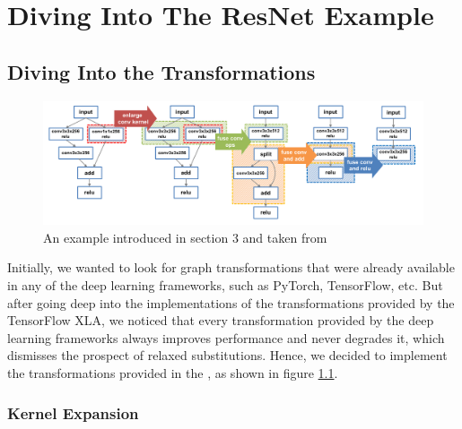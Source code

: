 \documentclass[12pt,a4paper,twoside,openright,bibliography=totocnumbered]{report}
\begin{document}
\appendix

\chapter{Diving Into The ResNet Example}
\section{Diving Into the Transformations}
\begin{figure}[ht!]
    \begin{center}
	      \includegraphics[scale=0.3]{reportImages/resnetExample.png}   
    \end{center}	
    \caption{An example introduced in section 3 and taken from \cite{jia2019}}
	\label{resnet_jia}
\end{figure}
 
 Initially, we wanted to look for graph transformations that were already available in any of the deep learning frameworks, such as PyTorch, TensorFlow, etc. But after going deep into the implementations of the transformations provided by the TensorFlow XLA, we noticed that every transformation provided by the deep learning frameworks always improves performance and never degrades it, which dismisses the prospect of relaxed substitutions. Hence, we decided to implement the transformations provided in the \cite{jia2019}, as shown in figure \ref{resnet_jia}.

\subsection{Kernel Expansion}
\end{document}
